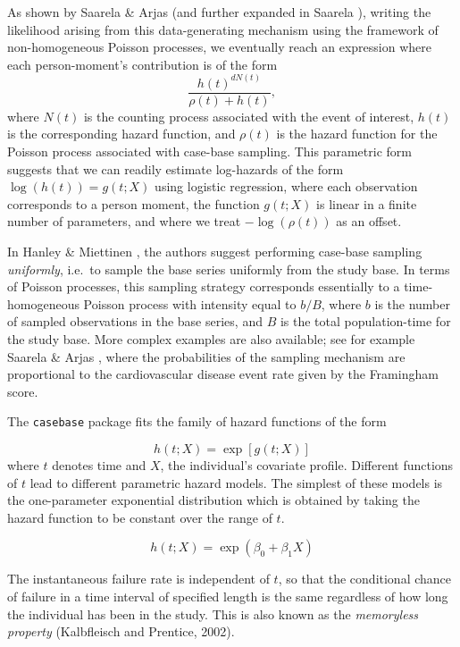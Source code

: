\documentclass[
]{jss}
\begin{document}
As shown by Saarela \& Arjas \citeyearpar{saarela2015non} (and further
expanded in Saarela \citeyearpar{saarela2016case}), writing the
likelihood arising from this data-generating mechanism using the
framework of non-homogeneous Poisson processes, we eventually reach an
expression where each person-moment's contribution is of the form
\[\frac{h(t)^{dN(t)}}{\rho(t) + h(t)},\] where \(N(t)\) is the counting
process associated with the event of interest, \(h(t)\) is the
corresponding hazard function, and \(\rho(t)\) is the hazard function
for the Poisson process associated with case-base sampling. This
parametric form suggests that we can readily estimate log-hazards of the
form \(\log(h(t)) = g(t; X)\) using logistic regression, where each
observation corresponds to a person moment, the function \(g(t; X)\) is
linear in a finite number of parameters, and where we treat
\(-\log(\rho(t))\) as an offset.

In Hanley \& Miettinen \citeyearpar{hanley2009fitting}, the authors
suggest performing case-base sampling \emph{uniformly}, i.e.~to sample
the base series uniformly from the study base. In terms of Poisson
processes, this sampling strategy corresponds essentially to a
time-homogeneous Poisson process with intensity equal to \(b/B\), where
\(b\) is the number of sampled observations in the base series, and
\(B\) is the total population-time for the study base. More complex
examples are also available; see for example Saarela \& Arjas
\citeyearpar{saarela2015non}, where the probabilities of the sampling
mechanism are proportional to the cardiovascular disease event rate
given by the Framingham score.

The \texttt{casebase} package fits the family of hazard functions of the
form

\[ h(t;X) = \exp[g(t;X)] \] where \(t\) denotes time and \(X\), the
individual's covariate profile. Different functions of \(t\) lead to
different parametric hazard models. The simplest of these models is the
one-parameter exponential distribution which is obtained by taking the
hazard function to be constant over the range of \(t\).

\[ h(t;X) = \exp(\beta_0 + \beta_1 X) \]

The instantaneous failure rate is independent of \(t\), so that the
conditional chance of failure in a time interval of specified length is
the same regardless of how long the individual has been in the study.
This is also known as the \emph{memoryless property} (Kalbfleisch and
Prentice, 2002).
\end{document}
